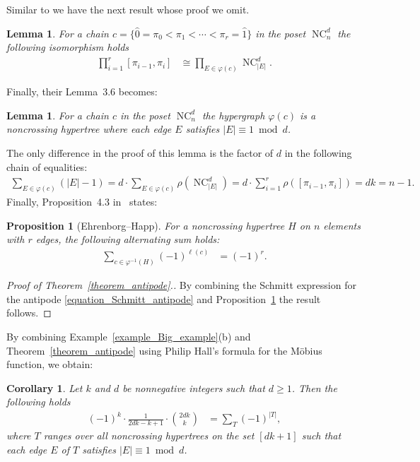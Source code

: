 \documentclass[11pt]{amsart}
\newtheorem{proposition}[theorem]{Proposition}
\newtheorem{lemma}[theorem]{Lemma}
\newtheorem{corollary}[theorem]{Corollary}
\numberwithin{equation}{section}
\newcommand{\hz}{\widehat{0}}
\newcommand{\ho}{\widehat{1}}
\DeclareMathOperator{\NC}{NC}
\begin{document}
Similar to \cite[Lemma~3.3 and Corollary~3.5]{Ehrenborg_Happ}
we have the next result whose proof we omit.
\begin{lemma}
For a chain $c = \{\hz = \pi_{0} < \pi_{1} < \cdots < \pi_{r} = \ho\}$ in the poset $\NC^{d}_{n}$
the following isomorphism holds
\begin{align*}
\prod_{i=1}^{r} [\pi_{i-1},\pi_{i}] 
& \cong
\prod_{E \in \varphi(c)} \NC^{d}_{|E|} .
\end{align*}
\label{lemma_Ehrenborg_Happ_Lemma_3.3_Corollary_3.5}
\end{lemma}
Finally, their Lemma~3.6 becomes:
\begin{lemma}
For a chain $c$ in the poset $\NC^{d}_{n}$
the hypergraph $\varphi(c)$ is a noncrossing hypertree where each edge
$E$ satisfies $|E| \equiv 1 \bmod d$.
\label{lemma_Ehrenborg_Happ_Lemma_3.6}
\end{lemma}
The only difference in the proof of this lemma is the factor of $d$
in the following chain of equalities:
\begin{align*}
\sum_{E \in \varphi(c)} (|E|-1)
=
d \cdot \sum_{E \in \varphi(c)} \rho\left(\NC^{d}_{|E|}\right)
=
d \cdot \sum_{i=1}^{r} \rho([\pi_{i-1},\pi_{i}])
=
d k = n-1 .
\end{align*}
Finally, Proposition~4.3 in~\cite{Ehrenborg_Happ} states:
\begin{proposition}[Ehrenborg--Happ]
For a noncrossing hypertree $H$ on $n$ elements with $r$ edges,
the following alternating sum holds:
\begin{align*}
\sum_{c \in \varphi^{-1}(H)} (-1)^{\ell(c)}
& =
(-1)^{r} .
\end{align*}
\label{proposition_fiber}
\end{proposition}

\begin{proof}[Proof of Theorem~\ref{theorem_antipode}.]
By combining the Schmitt expression for the antipode \eqref{equation_Schmitt_antipode}
and Proposition~\ref{proposition_fiber} the result follows.
\end{proof}


By combining Example~\ref{example_Big_example}(b)
and Theorem~\ref{theorem_antipode}
using Philip Hall's formula for the M\"obius function,
we obtain:

\begin{corollary}
Let $k$ and $d$ be nonnegative integers such that $d \geq 1$.
Then the following holds
\begin{align*}
(-1)^{k} \cdot \frac{1}{2dk-k+1} \cdot \binom{2dk}{k}
& =
\sum_{T} (-1)^{|T|} ,
\end{align*}
where $T$ ranges over all noncrossing hypertrees on the set $[dk+1]$
such that each edge $E$ of $T$ satisfies $|E| \equiv 1 \bmod d$.
\end{corollary}
\end{document}

